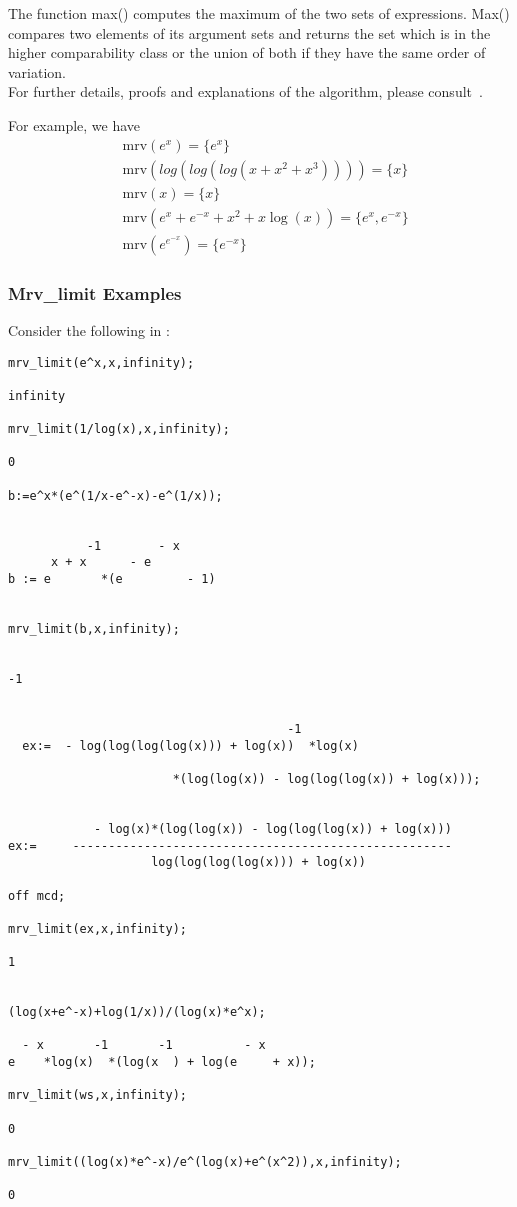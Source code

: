 The function max() computes the maximum of the two sets of expressions. Max() compares two elements of its argument sets and returns the set which is in the higher comparability class or the union of both if they have the same order of variation. \\[\baselineskip]
%
For further details, proofs and explanations of the algorithm, please consult~\cite{Gruntz:96}.

For example, we have
\begin{align*}
&\text{mrv}(e^{x})=\{e^x\} \\
&\text{mrv}(log(log(log(x+x^2+x^3))))=\{x\}  \\
&\text{mrv}(x)=\{x\} \\
&\text{mrv}(e^x+e^{-x}+x^2+x \log(x))= \{e^x,e^{-x} \} \\
&\text{mrv}(e^{e^{-x}})=\{e^{-x} \} 
\end{align*}

\subsubsection{Mrv\_limit Examples}
Consider the following in \REDUCE:
\begin{verbatim}
mrv_limit(e^x,x,infinity);

infinity

mrv_limit(1/log(x),x,infinity);

0

b:=e^x*(e^(1/x-e^-x)-e^(1/x));


           -1        - x
      x + x      - e
b := e       *(e         - 1)


mrv_limit(b,x,infinity);


-1


                                       -1
  ex:=  - log(log(log(log(x))) + log(x))  *log(x)

                       *(log(log(x)) - log(log(log(x)) + log(x)));


            - log(x)*(log(log(x)) - log(log(log(x)) + log(x)))
ex:=     -----------------------------------------------------
                    log(log(log(log(x))) + log(x))

off mcd;

mrv_limit(ex,x,infinity);

1


(log(x+e^-x)+log(1/x))/(log(x)*e^x);

  - x       -1       -1          - x
e    *log(x)  *(log(x  ) + log(e     + x));

mrv_limit(ws,x,infinity);

0

mrv_limit((log(x)*e^-x)/e^(log(x)+e^(x^2)),x,infinity);

0

\end{verbatim}
\normalsize
